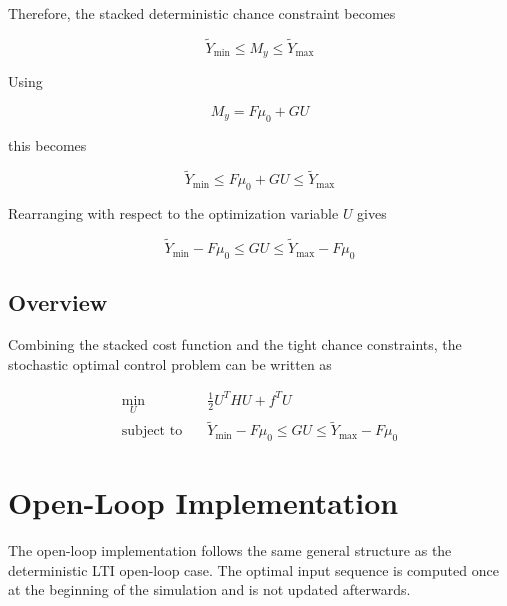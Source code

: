 Therefore, the stacked deterministic chance constraint becomes

\begin{equation}
    \boxed{
        \tilde{Y}_{\min}
        \leq
        M_y
        \leq
        \tilde{Y}_{\max}
    }
\end{equation}

Using

\begin{equation}
    M_y
    =
    F\mu_0+GU
\end{equation}

this becomes

\begin{equation}
    \tilde{Y}_{\min}
    \leq
    F\mu_0+GU
    \leq
    \tilde{Y}_{\max}
\end{equation}

Rearranging with respect to the optimization variable \(U\) gives

\begin{equation}
    \boxed{
        \tilde{Y}_{\min}-F\mu_0
        \leq
        GU
        \leq
        \tilde{Y}_{\max}-F\mu_0
    }
    \label{eq:stochastic_stacked_constraints}
\end{equation}

\subsection*{Overview}

Combining the stacked cost function and the tight chance constraints, the stochastic optimal control problem can be written as

\begin{equation}
\boxed{
\begin{aligned}
    \min_U
    \quad &
    \frac{1}{2}U^THU+f^TU
    \\[1mm]
    \text{subject to}
    \quad &
    \tilde{Y}_{\min}-F\mu_0
    \leq
    GU
    \leq
    \tilde{Y}_{\max}-F\mu_0
\end{aligned}
}
\label{eq:stochastic_final_qp}
\end{equation}

\section{Open-Loop Implementation}
\label{sec:stochastic_open_loop}

The open-loop implementation follows the same general structure as the deterministic LTI open-loop case. The optimal input sequence is computed once at the beginning of the simulation and is not updated afterwards.

